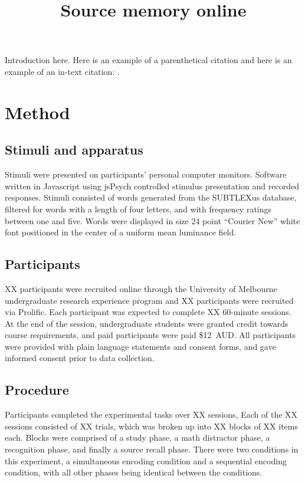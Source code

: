 \documentclass[10pt, a4paper, man, biblatex]{apa6}
\title{Source memory online}
\begin{document}
\maketitle %

Introduction here. Here is an example of a parenthetical citation
\parencite{Harlow2013} and here is an example of an in-text citation:
\textcite{Smith2016}.

\section{Method}
\subsection{Stimuli and apparatus}
Stimuli were presented on participants' personal computer monitors. Software written in Javascript using jsPsych \parencite{deLeeuw2015} controlled stimulus presentation and recorded responses. Stimuli consisted of words generated from the SUBTLEXus database, filtered for words with a length of four letters, and with frequency ratings between one and five. Words were displayed in size 24 point ``Courier New'' white font positioned in the center of a uniform mean luminance field. 

\subsection{Participants}
XX participants were recruited online through the University of Melbourne undergraduate research experience program and XX participants were recruited via Prolific. Each participant was expected to complete XX 60-minute sessions. At the end of the session, undergraduate students were granted credit towards course requirements, and paid participants were paid \$12~AUD. All participants were provided with plain language statements and consent forms, and gave informed consent prior to data collection.

\subsection{Procedure}
Participants completed the experimental tasks over XX sessions, Each of the XX sessions consisted of XX trials, which was broken up into XX blocks of XX items each. Blocks were comprised of a study phase, a math distractor phase, a recognition phase, and finally a source recall phase. There were two conditions in this experiment, a simultaneous encoding condition and a sequential encoding condition, with all other phases being identical between the conditions. 
\end{document}
